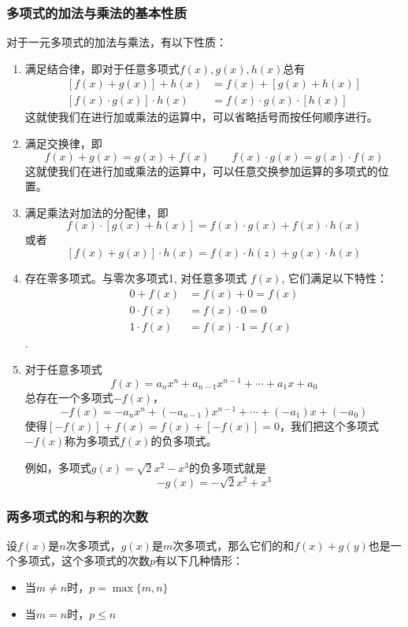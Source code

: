 \subsubsection{多项式的加法与乘法的基本性质}

对于一元多项式的加法与乘法，有以下性质：
\begin{enumerate}
    \item 满足结合律，即对于任意多项式$f(x),g(x),h(x)$总有
\[\begin{split}
   [ f (x) +g (x) ] +h (x) &=f (x) +[g (x) +h (x) ]\\
    [f (x) \cdot g (x) ] \cdot h (x) &=f (x) \cdot g (x) \cdot [h (x) ]
\end{split}\]    
这就使我们在进行加或乘法的运算中，可以省略括号而按任何顺序进行。

\item 满足交换律，即
\[f (x) +g (x) =g (x) +f(x)\qquad f (x) \cdot g (x) =g (x) \cdot f (x) \]
这就使我们在进行加或乘法的运算中，可以任意交换参加运算的多项式的位置。
\item 满足乘法对加法的分配律，即
\[f (x) \cdot  [g (x) +h (x) ] =f (x) \cdot g (x) +f(x)\cdot h(x)\]
或者 \[[f(x)+g(x)]\cdot h(x) =f(x)\cdot h(z) +g(x)\cdot h(x)\]
\item 存在零多项式。与零次多项式1, 对任意多项式
$f(x)$, 它们满足以下特性：
\[\begin{split}
    0+f (x) &=f (x) +0=f (x) \\
    0\cdot f (x) &=f (x) \cdot 0=0\\
    1\cdot f (x) &=f (x) \cdot 1=f (x) 
\end{split}\].
\item 对于任意多项式
\[f(x)=a_nx^n+a_{n-1}x^{n-1}+\cdots+a_1x+a_0\]
总存在一个多项式$-f(x)$，
\[-f(x)=-a_nx^n+(-a_{n-1})x^{n-1}+\cdots+(-a_1)x+(-a_0)\]
使得$[-f(x)]+f(x)=f(x)+[-f(x)]=0$，我们把这个多项式$-f(x)$称为多项式$f(x)$的负多项式。

例如，多项式$g(x)=\sqrt{2}x^2-x^3$的负多项式就是
\[-g(x)=-\sqrt{2}x^2+x^3\]
\end{enumerate}

\subsubsection{两多项式的和与积的次数}

设$f(x)$是$n$次多项式，$g(x)$是$m$次多项式，那么它们的和$f(x)+g(y)$也是一个多项式，这个多项式的次数$p$有以下几种情形：
\begin{itemize}
    \item 当$m\ne n$时，$p=\max\{m,n\}$
    \item 当$m=n$时，$p\le n$
\end{itemize}

